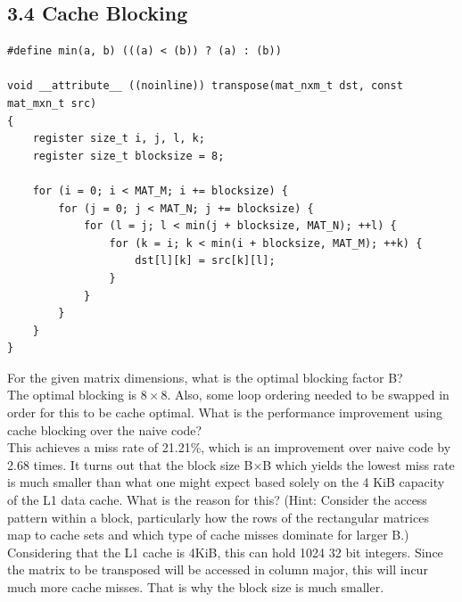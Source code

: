 \documentclass[11pt]{article}
\begin{document}
\subsection*{3.4 Cache Blocking}
\lstset{language=c}
\begin{lstlisting}
#define min(a, b) (((a) < (b)) ? (a) : (b))

void __attribute__ ((noinline)) transpose(mat_nxm_t dst, const mat_mxn_t src)
{
    register size_t i, j, l, k;
    register size_t blocksize = 8;
    
    for (i = 0; i < MAT_M; i += blocksize) {
        for (j = 0; j < MAT_N; j += blocksize) {    
            for (l = j; l < min(j + blocksize, MAT_N); ++l) {
                for (k = i; k < min(i + blocksize, MAT_M); ++k) {
                    dst[l][k] = src[k][l];
                }
            }
        }
    }
}
\end{lstlisting}

\begin{Parts}
	\Part For the given matrix dimensions, what is the optimal blocking factor B? \\
	The optimal blocking is $8\times8$. Also, some loop ordering needed to be swapped in order for this to be cache optimal.
	\Part What is the performance improvement using cache blocking over the naive code? \\
	This achieves a miss rate of 21.21\%, which is an improvement over naive code by 2.68 times.
	\Part It turns out that the block size B×B which yields the lowest miss rate is much smaller than what one might expect based solely on the 4 KiB capacity of the L1 data cache. What is the reason for this? (Hint: Consider the access pattern within a block, particularly how the rows of the rectangular matrices map to cache sets and which type of cache misses dominate for larger B.) \\
	Considering that the L1 cache is 4KiB, this can hold 1024 32 bit integers. Since the matrix to be transposed will be accessed in column major, this will incur much more cache misses. That is why the block size is much smaller.
\end{Parts}
\newpage

\end{document}
